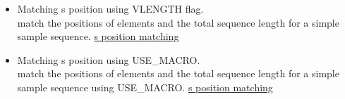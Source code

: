 \begin{itemize}
   \item Matching s position using VLENGTH flag.\\
     match the positions of elements and the total sequence length
     for a simple sample sequence.
     \href{https://github.com/MethodicalAcceleratorDesign/madx-examples/blob/master/match/s-match/job.s-match.madx}
     {s position matching}
     
   \item Matching s position using USE\_MACRO.\\
     match the positions of elements and the total sequence length for a simple sample sequence using USE\_MACRO.
     \href{https://github.com/MethodicalAcceleratorDesign/madx-examples/blob/master/match/s-match-usemacro/job.s-match-usemacro.madx}
     {s position matching}
     
\end{itemize}


